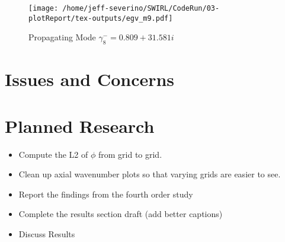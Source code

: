 \documentclass[a4paper]{article}
\begin{document}
 \begin{figure}
     \centering
     \texttt{[image: /home/jeff-severino/SWIRL/CodeRun/03-plotReport/tex-outputs/egv\_m9.pdf]}
     \caption{Propagating Mode $\gamma^-_8 =0.809 + 31.581i $}
     \label{fig:19} 
 \end{figure}

\section{Issues and Concerns}

\section{Planned Research}
\begin{itemize}
    \item Compute the L2 of $\phi$ from grid to grid. 
    \item Clean up axial wavenumber plots so that varying grids are easier to
        see.
    \item Report the findings from the fourth order study
    \item Complete the results section draft (add better captions)
    \item Discuss Results
\end{itemize}
\end{document}
